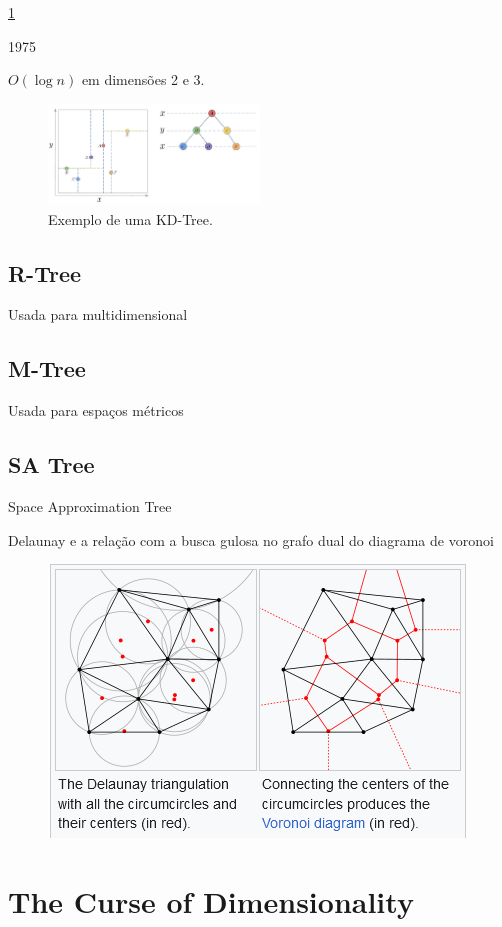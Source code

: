 \cref{fig:kdtree}

1975 \cite{kdtree:wiki,kdtree:bentley1975}

$O(\log n)$ em dimensões 2 e 3.

\begin{figure}
    \centering
    \includegraphics[width=0.5\textwidth]{imgs/kdtree.png}
    \caption{Exemplo de uma KD-Tree.}
    \label{fig:kdtree}
\end{figure}

\subsection{R-Tree}

Usada para multidimensional

\subsection{M-Tree}

Usada para espaços métricos\cite{mtree:ciaccia1997}

\subsection{SA Tree}

Space Approximation Tree\cite{searching:navarro2002}

Delaunay\cite{delaunay:wiki} e a relação com a busca gulosa no grafo dual do diagrama de voronoi

\begin{figure}
    \centering
    \includegraphics[width=0.5\linewidth]{imgs/delaunayvoronoi.png}
\end{figure}

\section{The Curse of Dimensionality}

